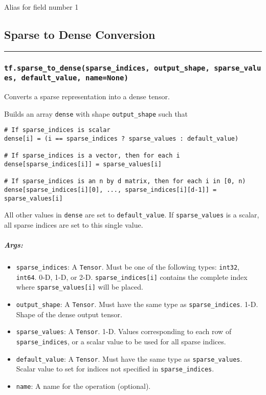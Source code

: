 Alias for field number 1

\subsection{Sparse to Dense Conversion
}\label{sparse-to-dense-conversion}

\begin{center}\rule{0.5\linewidth}{\linethickness}\end{center}

\subsubsection{\texorpdfstring{\texttt{tf.sparse\_to\_dense(sparse\_indices,\ output\_shape,\ sparse\_values,\ default\_value,\ name=None)}
}{tf.sparse\_to\_dense(sparse\_indices, output\_shape, sparse\_values, default\_value, name=None) }}\label{tf.sparseux5ftoux5fdensesparseux5findices-outputux5fshape-sparseux5fvalues-defaultux5fvalue-namenone}

Converts a sparse representation into a dense tensor.

Builds an array \texttt{dense} with shape \texttt{output\_shape} such
that

\begin{verbatim}
# If sparse_indices is scalar
dense[i] = (i == sparse_indices ? sparse_values : default_value)

# If sparse_indices is a vector, then for each i
dense[sparse_indices[i]] = sparse_values[i]

# If sparse_indices is an n by d matrix, then for each i in [0, n)
dense[sparse_indices[i][0], ..., sparse_indices[i][d-1]] = sparse_values[i]
\end{verbatim}

All other values in \texttt{dense} are set to \texttt{default\_value}.
If \texttt{sparse\_values} is a scalar, all sparse indices are set to
this single value.

\subparagraph{Args: }\label{args-1}

\begin{itemize}
\tightlist
\item
  \texttt{sparse\_indices}: A \texttt{Tensor}. Must be one of the
  following types: \texttt{int32}, \texttt{int64}. 0-D, 1-D, or 2-D.
  \texttt{sparse\_indices{[}i{]}} contains the complete index where
  \texttt{sparse\_values{[}i{]}} will be placed.
\item
  \texttt{output\_shape}: A \texttt{Tensor}. Must have the same type as
  \texttt{sparse\_indices}. 1-D. Shape of the dense output tensor.
\item
  \texttt{sparse\_values}: A \texttt{Tensor}. 1-D. Values corresponding
  to each row of \texttt{sparse\_indices}, or a scalar value to be used
  for all sparse indices.
\item
  \texttt{default\_value}: A \texttt{Tensor}. Must have the same type as
  \texttt{sparse\_values}. Scalar value to set for indices not specified
  in \texttt{sparse\_indices}.
\item
  \texttt{name}: A name for the operation (optional).
\end{itemize}

